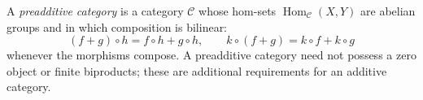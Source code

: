 
A \emph{preadditive category} is a category $\mathcal C$ whose hom-sets $\operatorname{Hom}_{\mathcal C}(X,Y)$ are abelian groups and in which composition is bilinear:
\[
(f+g)\circ h=f\circ h+g\circ h,\qquad k\circ(f+g)=k\circ f+k\circ g
\]
whenever the morphisms compose. A preadditive category need not possess a zero object or finite biproducts; these are additional requirements for an additive category.
